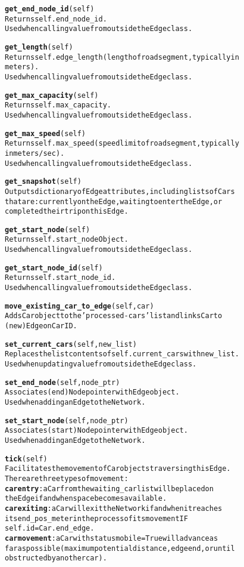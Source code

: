 \begin{alltt}
\textbf{get_end_node_id}(self)
Returns self.end_node_id.
Used when calling value from outside the Edge class.

\textbf{get_length}(self)
Returns self.edge_length (length of road segment, typically in 
meters).
Used when calling value from outside the Edge class.

\textbf{get_max_capacity}(self)
Returns self.max_capacity.
Used when calling value from outside the Edge class.

\textbf{get_max_speed}(self)
Returns self.max_speed (speed limit of road segment, typically
in meters/sec).
Used when calling value from outside the Edge class.

\textbf{get_snapshot}(self)
Outputs dictionary of Edge attributes, including lists of Cars 
that are:  currently on the Edge, waiting to enter the Edge, or 
completed their trip on this Edge.

\textbf{get_start_node}(self)
Returns self.start_node Object.
Used when calling value from outside the Edge class.

\textbf{get_start_node_id}(self)
Returns self.start_node_id.
Used when calling value from outside the Edge class.

\textbf{move_existing_car_to_edge}(self, car)
Adds Car object to the 'processed-cars' list and links Car to 
(new) Edge on Car ID.

\textbf{set_current_cars}(self, new_list)
Replaces the list contents of self.current_cars with new_list.
Used when updating value from outside the Edge class.

\textbf{set_end_node}(self, node_ptr)
Associates (end) Node pointer with Edge object.
Used when adding an Edge to the Network.

\textbf{set_start_node}(self, node_ptr)
Associates (start) Node pointer with Edge object.
Used when adding an Edge to the Network.

\textbf{tick}(self)
Facilitates the movement of Car objects traversing this Edge.  
There are three types of movement:
\textbf{car entry}:  a Car from the waiting_car list will be placed on 
the Edge if and when space becomes available.
\textbf{car exiting}:  a Car will exit the Network if and when it reaches
its end_pos_meter in the process of its movement IF 
self.id = Car.end_edge.
\textbf{car movement}:  a Car with status mobile = True will advance as
far as possible (maximum potential distance, edge end, or until 
obstructed by another car).

\end{alltt}


